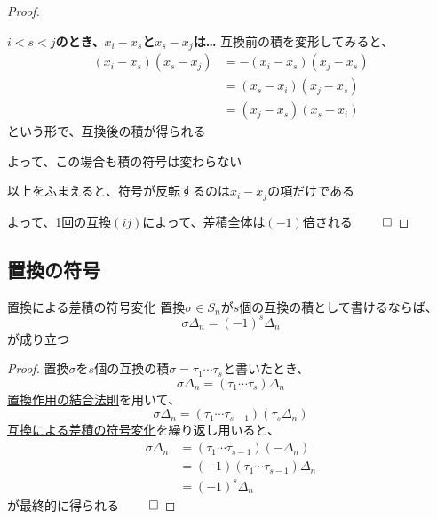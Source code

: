 \documentclass[../../../topic_linear-algebra]{subfiles}
\begin{document}
\begin{proof}
\begin{subpattern}{\bfseries $i < s < j$のとき、$x_i - x_s$と$x_s - x_j$は…}
    互換前の積を変形してみると、
    \begin{align*}
      (x_i - x_s)(x_s - x_j) & = -(x_i - x_s)(x_j - x_s) \\
                             & = (x_s - x_i)(x_j - x_s)  \\
                             & = (x_j - x_s)(x_s - x_i)
    \end{align*}
    という形で、互換後の積が得られる

    よって、この場合も積の符号は変わらない
  \end{subpattern}

  以上をふまえると、符号が反転するのは$x_i - x_j$の項だけである

  よって、1回の互換$(ij)$によって、差積全体は$(-1)$倍される $\qed$
\end{proof}

\subsection{置換の符号}

\begin{theorem}{置換による差積の符号変化}
  置換$\sigma \in S_n$が$s$個の互換の積として書けるならば、
  \begin{equation*}
    \sigma \Delta_n = (-1)^s \Delta_n
  \end{equation*}
  が成り立つ
\end{theorem}

\begin{proof}
  置換$\sigma$を$s$個の互換の積$\sigma = \tau_1 \cdots \tau_s$と書いたとき、
  \begin{equation*}
    \sigma \Delta_n = (\tau_1 \cdots \tau_s) \Delta_n
  \end{equation*}
  \hyperref[thm:permutation-action-associativity]{置換作用の結合法則}を用いて、
  \begin{equation*}
    \sigma \Delta_n = (\tau_1 \cdots \tau_{s-1}) (\tau_s \Delta_n)
  \end{equation*}
  \hyperref[thm:transposition-negates-delta]{互換による差積の符号変化}を繰り返し用いると、
  \begin{align*}
    \sigma \Delta_n & = (\tau_1 \cdots \tau_{s-1}) (-\Delta_n)  \\
                    & = (-1)(\tau_1 \cdots \tau_{s-1}) \Delta_n \\
                    & = (-1)^s \Delta_n
  \end{align*}
  が最終的に得られる $\qed$
\end{proof}
\end{document}

